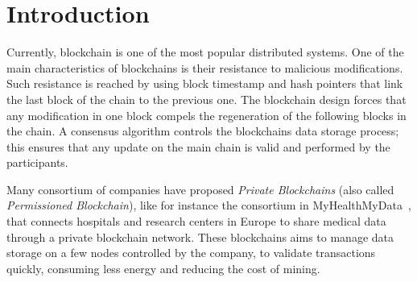 \documentclass[conference]{IEEEtran}
\newcommand{\name}{BlindCons}
\begin{document}
\maketitle


\begin{abstract}
Private blockchains are becoming gradually more sought-after in many organizations. Predominately because they allow organizations to overpass the traditional limitations of public blockchains in terms of energy consumption, efficiency, and control of the system. However, such systems are in some ways losing their blockchain essence, particularly their unique feature of not being controlled by a central authority that governs many functionalities of the chain including user enrollment. Our main contribution in this paper is to propose a user ID privacy preserving consensus algorithm for private blockchains, called \name{}. The main security guarantees of \name{} are:  consistency of the data stored in the blockchain, liveness of the system and privacy of the users by blinding their signatures to keep the user identity private. We ensure that it is not possible to link a transaction to somebody using the data stored in the blockchain. Our consensus \name{} uses Okamoto-Schnorr Blind Signature proposed in 1992 and is based on Practical Byzantine Fault Tolerance (PBFT) consensus proposed by Castro et al. in 1999. 
\end{abstract}

\section{Introduction} \label{intro}

Currently, blockchain is one of the most popular distributed systems. One of the main characteristics of blockchains is their resistance to malicious modifications. Such resistance is reached by using block timestamp and hash pointers that link the last block of the chain to the previous one. The blockchain design forces that any modification in one block compels the regeneration of the following blocks in the chain. A consensus algorithm controls the blockchains data storage process; this ensures that any update on the main chain is valid and performed by the participants.

Many consortium of companies have proposed  \emph{Private Blockchains} (also called \emph{Permissioned Blockchain}), like for instance the consortium in MyHealthMyData~\cite{MHMD}, that connects hospitals and research centers in Europe to share medical data through a private blockchain network. These blockchains aims to manage data storage on a few nodes controlled by the company, to validate transactions quickly, consuming less energy and  reducing the cost of mining. 
\end{document}
